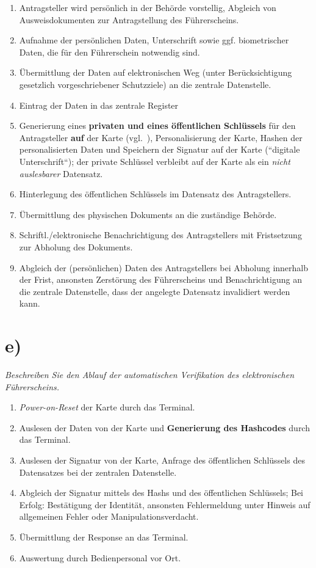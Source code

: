 \begin{enumerate}
    \itemsep0.5em
    \item Antragsteller wird persönlich in der Behörde vorstellig, Abgleich von Ausweisdokumenten zur Antragstellung des Führerscheins.
    \item Aufnahme der persönlichen Daten, Unterschrift sowie ggf. biometrischer Daten, die für den Führerschein notwendig sind.
    \item Übermittlung der Daten auf elektronischen Weg (unter Berücksichtigung gesetzlich vorgeschriebener Schutzziele) an die zentrale Datenstelle.
    \item Eintrag der Daten in das zentrale Register
    \item Generierung eines \textbf{privaten und eines öffentlichen Schlüssels} für den Antragsteller \textbf{auf} der Karte (vgl.~\cite[17 f.]{ITS5}), Personalisierung der Karte, Hashen der personalisierten Daten und Speichern der Signatur auf der Karte (``digitale Unterschrift``); der private Schlüssel verbleibt auf der Karte als ein \textit{nicht auslesbarer} Datensatz.
    \item Hinterlegung des öffentlichen Schlüssels im Datensatz des Antragstellers.
    \item Übermittlung des physischen Dokuments an die zuständige Behörde.
    \item Schriftl./elektronische Benachrichtigung des Antragstellers mit Fristsetzung zur Abholung des Dokuments.
    \item Abgleich der (persönlichen) Daten des Antragstellers bei Abholung innerhalb der Frist, ansonsten Zerstörung des Führerscheins und Benachrichtigung an die zentrale Datenstelle, dass der angelegte Datensatz invalidiert werden kann.
\end{enumerate}


\section{e)}

\textit{Beschreiben Sie den Ablauf der automatischen Verifikation des elektronischen
Führerscheins.}

\begin{enumerate}
    \itemsep0.5em
    \item \textit{Power-on-Reset} der Karte durch das Terminal.
    \item Auslesen der Daten von der Karte und \textbf{Generierung des Hashcodes} durch das Terminal.
    \item Auslesen der Signatur von der Karte, Anfrage des öffentlichen Schlüssels des Datensatzes bei der zentralen Datenstelle.
    \item Abgleich der Signatur mittels des Hashs und des öffentlichen Schlüssels; Bei Erfolg: Bestätigung der Identität, ansonsten Fehlermeldung unter Hinweis auf allgemeinen Fehler oder Manipulationsverdacht.
    \item Übermittlung der Response an das Terminal.
    \item Auswertung durch Bedienpersonal vor Ort.
\end{enumerate}